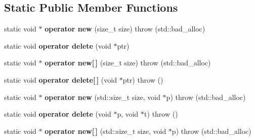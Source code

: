 \subsection*{Static Public Member Functions}
\begin{DoxyCompactItemize}
\item 
static void $\ast$ {\bfseries operator new} (size\+\_\+t size)  throw (std\+::bad\+\_\+alloc)\hypertarget{classirr_1_1core_1_1quaternion_a2c89ab4cd9c41206e0fdaf5421b1d01a}{}\label{classirr_1_1core_1_1quaternion_a2c89ab4cd9c41206e0fdaf5421b1d01a}

\item 
static void {\bfseries operator delete} (void $\ast$ptr)\hypertarget{classirr_1_1core_1_1quaternion_a6c0cec3ca47fcd10bb25cb931d99ca4d}{}\label{classirr_1_1core_1_1quaternion_a6c0cec3ca47fcd10bb25cb931d99ca4d}

\item 
static void $\ast$ {\bfseries operator new\mbox{[}$\,$\mbox{]}} (size\+\_\+t size)  throw (std\+::bad\+\_\+alloc)\hypertarget{classirr_1_1core_1_1quaternion_a8b4663f706b3ccb5bc1512fb5058395c}{}\label{classirr_1_1core_1_1quaternion_a8b4663f706b3ccb5bc1512fb5058395c}

\item 
static void {\bfseries operator delete\mbox{[}$\,$\mbox{]}} (void $\ast$ptr)  throw ()\hypertarget{classirr_1_1core_1_1quaternion_a06437adf56a7502dc4a923c8ac89a83a}{}\label{classirr_1_1core_1_1quaternion_a06437adf56a7502dc4a923c8ac89a83a}

\item 
static void $\ast$ {\bfseries operator new} (std\+::size\+\_\+t size, void $\ast$p)  throw (std\+::bad\+\_\+alloc)\hypertarget{classirr_1_1core_1_1quaternion_aef7b008372614fca8a4a0e461fe89f2e}{}\label{classirr_1_1core_1_1quaternion_aef7b008372614fca8a4a0e461fe89f2e}

\item 
static void {\bfseries operator delete} (void $\ast$p, void $\ast$t)  throw ()\hypertarget{classirr_1_1core_1_1quaternion_aacc43bc34ef99172c5e43fe4c2e5e2e7}{}\label{classirr_1_1core_1_1quaternion_aacc43bc34ef99172c5e43fe4c2e5e2e7}

\item 
static void $\ast$ {\bfseries operator new\mbox{[}$\,$\mbox{]}} (std\+::size\+\_\+t size, void $\ast$p)  throw (std\+::bad\+\_\+alloc)\hypertarget{classirr_1_1core_1_1quaternion_ab8471d31998c5d56925c449a70a64cf5}{}\label{classirr_1_1core_1_1quaternion_ab8471d31998c5d56925c449a70a64cf5}


\end{DoxyCompactItemize}
